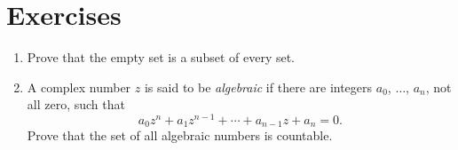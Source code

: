 \section{Exercises}

\begin{enumerate}
    \item Prove that the empty set is a subset of every set.
    \item\label{exercise:2.2} A complex number \(z\) is said to be \emph{algebraic} if there are integers \(a_0\), \(\ldots\), \(a_n\), not all zero, such that
    \begin{equation*}
        a_0z^n+a_1z^{n-1}+\cdots+a_{n-1}z+a_n=0.
    \end{equation*}
    Prove that the set of all algebraic numbers is countable. 
\end{enumerate}
